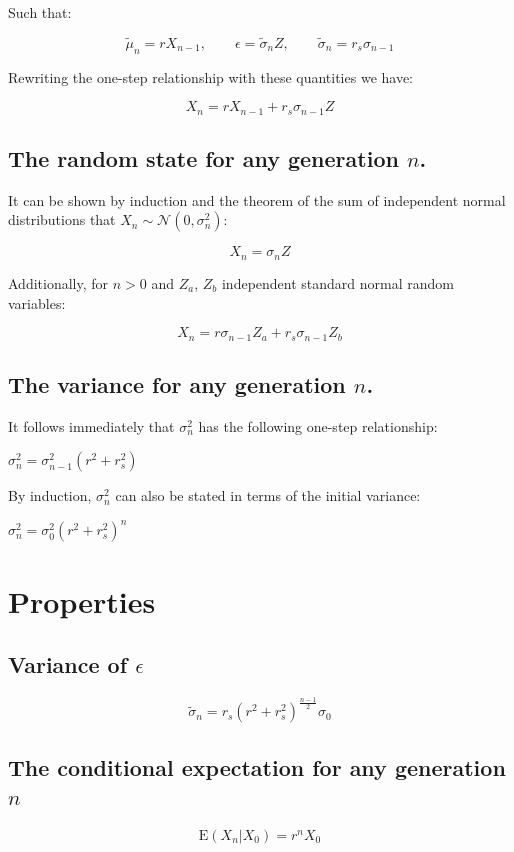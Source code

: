 \documentclass[a4paper,11pt]{article}
\begin{document}
Such that:

$$\tilde{\mu}_n = rX_{n-1}, \qquad \epsilon = \tilde{\sigma}_n Z, \qquad \tilde{\sigma}_n = r_s \sigma_{n-1}$$

Rewriting the one-step relationship with these quantities we have:

$$X_n = rX_{n-1} + r_s \sigma_{n-1}Z$$

\subsection{The random state for any generation $n$.}

It can be shown by induction and the theorem of the sum of independent normal distributions that $X_n \sim \mathcal{N}(0, \sigma_n^2)$:

$$X_n = \sigma_n Z$$

Additionally, for $n > 0$ and $Z_a$, $Z_b$ independent standard normal random variables:

$$X_n = r\sigma_{n-1}Z_a + r_s\sigma_{n-1}Z_b$$



\subsection{The variance for any generation $n$.}
It follows immediately that $\sigma_n^2$ has the following one-step relationship:

$\sigma_n^2 = \sigma_{n-1}^2(r^2+r_s^2)$

By induction, $\sigma_n^2$ can also be stated in terms of the initial variance:

$\sigma_n^2 = \sigma_{0}^2(r^2+r_s^2)^n$


\section{Properties}

\subsection{Variance of $\epsilon$}

$$\tilde{\sigma}_n = r_s (r^2+r_s^2)^{\frac{n-1}{2}} \sigma_0$$


\subsection{The conditional expectation for any generation $n$}

$$\mathrm{E}(X_n|X_0) = r^nX_0$$
\end{document}
